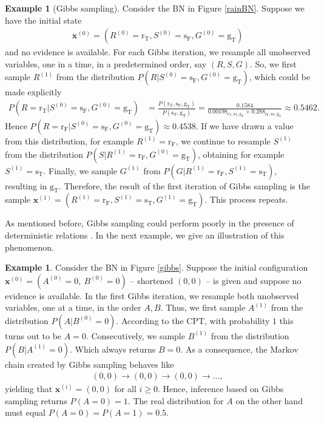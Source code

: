 \documentclass[a4paper, twoside, 11pt]{report}
\newcommand{\bfx}{{\mathbf{x}}}
\theoremstyle{plain}
\theoremstyle{definition}
\newtheorem{example}[thm]{Example}
\theoremstyle{remark}
\newcommand{\gT}{{\text{g}_\text{T} }}
\newcommand{\sT}{{\text{s}_\text{T} }}
\newcommand{\sF}{{\text{s}_\text{F} }}
\newcommand{\rr}{{\text{r} }}
\newcommand{\rT}{{\text{r}_\text{T} }}
\newcommand{\rF}{{\text{r}_\text{F} }}
\begin{document}
\begin{example}[Gibbs sampling]
Consider the BN in Figure \ref{rainBN}. Suppose we have the initial state 
\begin{align*}
\bfx^{(0)} = (R^{(0)} = \rT, S^{(0)} = \sF, G^{(0)} = \gT)
\end{align*}
and no evidence is available. For each Gibbs iteration, we resample all unobserved variables, one in a time, in a predetermined order, say $(R, S, G)$. So, we first sample $R^{(1)}$ from the distribution $P(R | S^{(0)} = \sF, G^{(0)} = \gT)$, which could be made explicitly
\begin{align*}
P(R = \rT | S^{(0)} = \sF, G^{(0)} = \gT) &= \frac{P(\rT, \sF,  \gT)}{P(\sT, \gT)} = \frac{0.1584}{0.00198_{\rT, \sT, \gT} + 0.288_{\rF, \sT, \gT}} \approx 0.5462.
\end{align*}
Hence $P(R = \rF | S^{(0)} = \sF, G^{(0)} = \gT) \approx 0.4538$. If we have drawn a value from this distribution, for example $R^{(1)} = \rF$, we continue to resample $S^{(1)}$ from the distribution $P(S | R^{(1)} = \rF, G^{(0)} = \gT)$, obtaining for example $S^{(1)} = \sT$. Finally, we sample $G^{(1)}$ from $P(G | R^{(1)} = \rF, S^{(1)} = \sT)$, resulting in $\gT$. Therefore, the result of the first iteration of Gibbs sampling is the sample $\bfx^{(1)} = (R^{(1)} = \rF, S^{(1)} = \sT, G^{(1)} = \gT)$. This process repeats.
\end{example}
As mentioned before, Gibbs sampling could perform poorly in the presence of deterministic relations \cite{koller2009probabilistic, poon2006sound, gogate2011samplesearch}. In the next example, we give an illustration of this phenomenon.
\begin{example}\label{ex:gibbs}
Consider the BN in Figure \ref{gibbs}. Suppose the initial configuration $\bfx^{(0)} = (A^{(0)} = 0,\ B^{(0)} = 0)$ -- shortened $(0,0)$ -- is given and suppose no evidence is available. 
In the first Gibbs iteration, we resample both unobserved variables, one at a time, in the order $A, B$. Thus, we first sample $A^{(1)}$ from the distribution $P(A | B^{(0)} = 0)$. According to the CPT, with probability $1$ this turns out to be $A=0$. Consecutively, we sample $B^{(1)}$ from the distribution $P(B | A^{(1)} = 0 )$. Which always returns $B = 0$. As a consequence, the Markov chain created by Gibbs sampling behaves like
\begin{align*}\label{gibbs-trap}
(0,0) \to (0,0) \to (0,0) \to \ldots ,
\end{align*}
yielding that $\bfx^{(i)} = (0,0)$ for all $i \geq 0$. Hence, inference based on Gibbs sampling returns $P(A=0) = 1$. The real distribution for $A$ on the other hand must equal $P(A=0) = P(A=1) = 0.5$.
\end{example}
\end{document}
